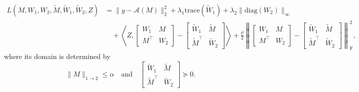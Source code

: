\documentclass[11pt]{article}
\begin{document}
\begin{equation}
\begin{aligned}
L(M,W_1,W_2,\widetilde{M},\widetilde{W}_1,\widetilde{W}_2,Z) 
&= \|y - \mathcal{A}(M)\|_2^2 + \lambda_1 \mathrm{trace}(\widetilde{W}_{1}) + \lambda_2 \|\mathrm{diag}(W_2)\|_\infty \\
&\quad + \left\langle Z, \begin{bmatrix} 
W_1 & M \\ M^\top & W_2
\end{bmatrix} 
- 
\begin{bmatrix} 
\widetilde{W}_1 & \widetilde{M} \\ \widetilde{M}^\top & \widetilde{W}_2
\end{bmatrix}  \right\rangle
+ \frac{\rho}{2} 
\left\|
\begin{bmatrix} 
W_1 & M \\ M^\top & W_2
\end{bmatrix} 
- 
\begin{bmatrix} 
\widetilde{W}_1 & \widetilde{M} \\ \widetilde{M}^\top & \widetilde{W}_2
\end{bmatrix} 
\right\|_\mathrm{F}^2,
\end{aligned}
\end{equation}
where its domain is determined by
\[
\|M\|_{1 \rightarrow 2} \leq \alpha
\quad \text{and} \quad 
\begin{bmatrix}
\widetilde{W}_1 & \widetilde{M} \\
\widetilde{M}^\top & \widetilde{W}_2
\end{bmatrix} \succeq 0.
\]
\end{document}
